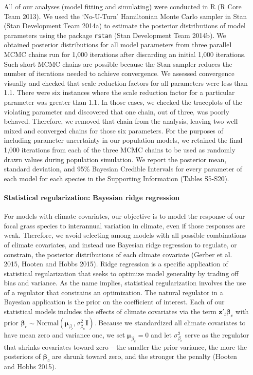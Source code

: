 \documentclass[12pt,]{article}
\begin{document}
All of our analyses (model fitting and simulating) were conducted in R
(R Core Team 2013). We used the `No-U-Turn' Hamiltonian Monte Carlo
sampler in Stan (Stan Development Team 2014a) to estimate the posterior
distributions of model parameters using the package \texttt{rstan} (Stan
Development Team 2014b). We obtained posterior distributions for all
model parameters from three parallel MCMC chains run for 1,000
iterations after discarding an initial 1,000 iterations. Such short MCMC
chains are possible because the Stan sampler reduces the number of
iterations needed to achieve convergence. We assessed convergence
visually and checked that scale reduction factors for all parameters
were less than 1.1. There were six instances where the scale reduction
factor for a particular parameter was greater than 1.1. In those cases,
we checked the traceplots of the violating parameter and discovered that
one chain, out of three, was poorly behaved. Therefore, we removed that
chain from the analysis, leaving two well-mixed and converged chains for
those six parameters. For the purposes of including parameter
uncertainty in our population models, we retained the final 1,000
iterations from each of the three MCMC chains to be used as randomly
drawn values during population simulation. We report the posterior mean,
standard deviation, and 95\% Bayesian Credible Intervals for every
parameter of each model for each species in the Supporting Information
(Tables S5-S20).

\paragraph{Statistical regularization: Bayesian ridge
regression}\label{statistical-regularization-bayesian-ridge-regression}

For models with climate covariates, our objective is to model the
response of our focal grass species to interannual variation in climate,
even if those responses are weak. Therefore, we avoid selecting among
models with all possible combinations of climate covariates, and instead
use Bayesian ridge regression to regulate, or constrain, the posterior
distributions of each climate covariate (Gerber et al. 2015, Hooten and
Hobbs 2015). Ridge regression is a specific application of statistical
regularization that seeks to optimize model generality by trading off
bias and variance. As the name implies, statistical regularization
involves the use of a regulator that constrains an optimization. The
natural regulator in a Bayesian application is the prior on the
coefficient of interest. Each of our statistical models includes the
effects of climate covariates via the term
\(\textbf{z}'_t \boldsymbol{\beta}_c\) with prior
\(\boldsymbol{\beta}_c \sim \text{Normal}(\boldsymbol{\mu}_{\beta_c}, \sigma_{\beta_c}^2\textbf{I})\).
Because we standardized all climate covariates to have mean zero and
variance one, we set \(\boldsymbol{\mu}_{\beta_c} = 0\) and let
\(\sigma_{\beta_c}^2\) serve as the regulator that shrinks covariates
toward zero -- the smaller the prior variance, the more the posteriors
of \(\boldsymbol{\beta}_c\) are shrunk toward zero, and the stronger the
penalty (Hooten and Hobbs 2015).
\end{document}
